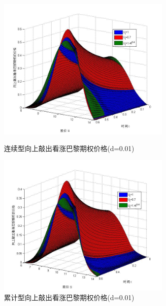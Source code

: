 \documentclass{ctexart} %
\begin{document}
\begin{figure}[H]
\label{mg1}
\begin{minipage}{0.48\linewidth}
\includegraphics[width=8.5cm]{code/mg1.jpg}
\caption{连续型向上敲出看涨巴黎期权价格(d=0.01)}
\end{minipage}
\begin{minipage}{0.48\linewidth}
\includegraphics[width=8.5cm]{code/mc1.jpg}
\caption{累计型向上敲出看涨巴黎期权价格(d=0.01)}
\end{minipage}
\end{figure}
\fi
\end{document}
